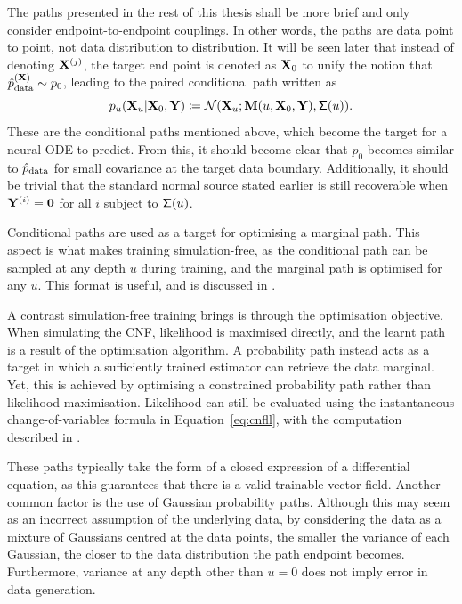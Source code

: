 The paths presented in the rest of this thesis shall be more brief and only consider endpoint-to-endpoint couplings. In other words, the paths are data point to point, not data distribution to distribution. It will be seen later that instead of denoting ${\mathbf{X}}^{(j)}$, the target end point is denoted as ${\mathbf{X}}_0$ to unify the notion that $\hat{p}_{\rm{data}}^{({\mathbf{X}})}\sim p_0$, leading to the paired conditional path written as
\[
p_u({\mathbf{X}}_u|{\mathbf{X}}_0,{\mathbf{Y}})\coloneqq{\mathcal{N}}({\mathbf{X}}_u;{\mathbf{M}}(u,{\mathbf{X}}_0,{\mathbf{Y}}),{\mathsf\Sigma}(u)).
\]
These are the conditional paths mentioned above, which become the target for a neural \ac{ODE} to predict. From this, it should become clear that $p_0$ becomes similar to $\hat{p}_{\rm{data}}$ for small covariance at the target data boundary. Additionally, it should be trivial that the standard normal source stated earlier is still recoverable when ${\mathbf{Y}}^{(i)}=\bm 0$ for all $i$ subject to ${\mathsf\Sigma}(u)$.

Conditional paths are used as a target for optimising a marginal path. This aspect is what makes training simulation-free, as the conditional path can be sampled at any depth $u$ during training, and the marginal path is optimised for any $u$. This format is useful, and is discussed in .

A contrast simulation-free training brings is through the optimisation objective. When simulating the \ac{CNF}, likelihood is maximised directly, and the learnt path is a result of the optimisation algorithm. A probability path instead acts as a target in which a sufficiently trained estimator can retrieve the data marginal. Yet, this is achieved by optimising a constrained probability path rather than likelihood maximisation. Likelihood can still be evaluated using the instantaneous change-of-variables formula in Equation~\eqref{eq:cnfll}, with the computation described in .


These paths typically take the form of a closed expression of a differential equation, as this guarantees that there is a valid trainable vector field. Another common factor is the use of Gaussian probability paths. Although this may seem as an incorrect assumption of the underlying data, by considering the data as a mixture of Gaussians centred at the data points, the smaller the variance of each Gaussian, the closer to the data distribution the path endpoint becomes. Furthermore, variance at any depth other than $u=0$ does not imply error in data generation.


